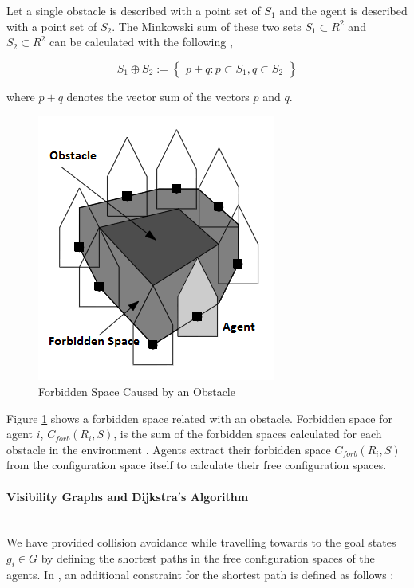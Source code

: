 Let a single obstacle is described with a point set of $S_1$ and the agent is described with a point set of $S_2$. The Minkowski sum of these two sets $S_1 \subset R^2$ and $S_2 \subset R^2$ can be calculated with the following \cite{92},
	
\begin{equation}
S_1 \oplus S_2 := \begin{Bmatrix}
p+q : p \subset S_1, q \subset S_2
\end{Bmatrix} 
\end{equation}

where $p+q$ denotes the vector sum of the vectors $p$ and $q$.
		
\begin{figure}[H]
\caption{Forbidden Space Caused by an Obstacle \cite{92}} \label{yasakli_bolge}
\centering
\includegraphics[scale = 0.75]{Forbidden}
\end{figure}
	
Figure \ref{yasakli_bolge} shows a forbidden space related with an obstacle. Forbidden space for agent $i$, $C_{forb}(R_i, S)$, is the sum of the forbidden spaces calculated for each obstacle in the environment \cite{92}. Agents extract their forbidden space $C_{forb}(R_i, S)$ from the configuration space itself to calculate their free configuration spaces.
	
\paragraph{Visibility Graphs and Dijkstra$'$s Algorithm}\hspace{0pt} \\
We have provided collision avoidance while travelling towards to the goal states $g_i \in G$ by defining the shortest paths in the free configuration spaces of the agents. In \cite{92}, an additional constraint for the shortest path is defined as follows : 

